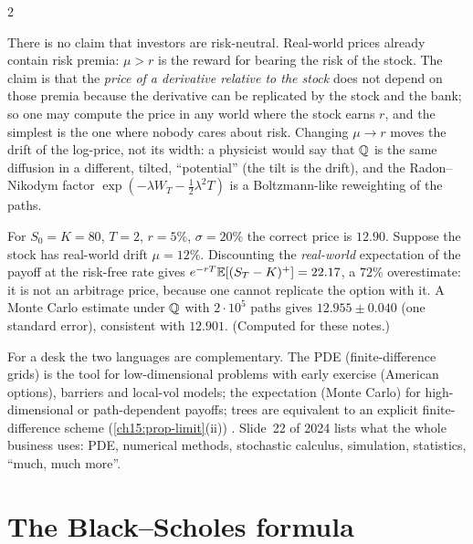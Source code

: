 \begin{paracol}{2}
\begin{intuition}
There is no claim that investors are risk-neutral. Real-world prices already contain risk premia: $\mu>r$ is the reward for bearing the risk of the stock. The claim is that the \emph{price of a derivative relative to the
stock} does not depend on those premia because the derivative can be replicated by the stock and the bank; so one may compute the price in any world where
the stock earns $r$, and the simplest is the one where nobody cares about risk. Changing $\mu\to r$ moves the drift of the log-price, not its width: a physicist would say that $\mathbb{Q}$ is the same
diffusion in a different, tilted, ``potential'' (the tilt is the drift), and the Radon--Nikodym factor $\exp(-\lambda W_T-\tfrac12\lambda^2T)$ is a
Boltzmann-like reweighting of the paths.
\end{intuition}

\begin{example}\label{ch15:ex-wrong}
For $S_0=K=80$, $T=2$, $r=5\%$, $\sigma=20\%$ the correct price is $12.90$. Suppose the stock has real-world drift $\mu=12\%$. Discounting the \emph{real-world} expectation
of the payoff at the risk-free rate gives $e^{-rT}\mathbb{E}[(S_T-K)^+]=22.17$, a $72\%$ overestimate: it is not an arbitrage price, because one cannot replicate the option with it. A Monte Carlo estimate under $\mathbb{Q}$ with $2\cdot10^5$
paths gives $12.955\pm0.040$ (one standard error), consistent with $12.901$. (Computed for these notes.)
\end{example}

\begin{finance}
For a desk the two languages are complementary. The PDE (finite-difference grids) is the tool for low-dimensional problems with early exercise (American options), barriers and local-vol models; the expectation
(Monte Carlo) for high-dimensional or path-dependent payoffs; trees are equivalent to an explicit finite-difference scheme (\cref{ch15:prop-limit}(ii)) .
Slide~22 of 2024 lists what the whole business uses: PDE, numerical methods, stochastic calculus, simulation, statistics, ``much, much more''.
\end{finance}

\section{The Black--Scholes formula}\label{ch15:sec-formula}


\end{paracol}
